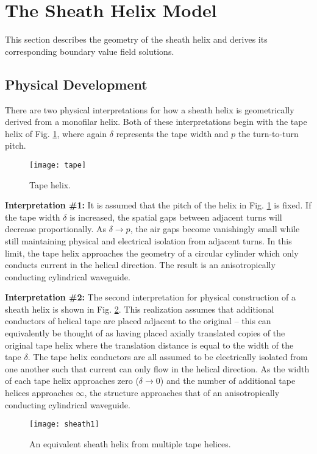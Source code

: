 \section{The Sheath Helix Model}\label{sec:sheath}
This section describes the geometry of the sheath helix and derives its corresponding boundary value field solutions. 
\subsection{Physical Development}
There are two physical interpretations for how a sheath helix is geometrically derived from a monofilar helix. Both of these interpretations begin with the tape helix of Fig. \ref{fig:tape}, where again $\delta$ represents the tape width and $p$ the turn-to-turn pitch. 
\begin{figure}[h]
	\centering
	\texttt{[image: tape]}
	\caption{Tape helix.}
	\label{fig:tape}
\end{figure}

\hspace*{2em} \textbf{Interpretation \#1:} It is assumed that the pitch of the helix in Fig. \ref{fig:tape} is fixed. If the tape width $\delta$ is increased, the spatial gaps between adjacent turns will decrease proportionally. As $\delta \rightarrow p$, the air gaps become vanishingly small while still maintaining physical and electrical isolation from adjacent turns. In this limit, the tape helix approaches the geometry of a circular cylinder which only conducts current in the helical direction. The result is an anisotropically conducting cylindrical waveguide. 

\hspace*{2em} \textbf{Interpretation \#2:} The second interpretation for physical construction of a sheath helix is shown in Fig. \ref{fig:sheath1}. This realization assumes that additional conductors of helical tape are placed adjacent to the original -- this can equivalently be thought of as having placed axially translated copies of the original tape helix where the translation distance is equal to the width of the tape $\delta$. The tape helix conductors are all assumed to be electrically isolated from one another such that current can only flow in the helical direction. As the width of each tape helix approaches zero ($\delta\rightarrow0$) and the number of additional tape helices approaches $\infty$, the structure approaches that of an anisotropically conducting cylindrical waveguide.
\begin{figure}[h]
	\centering
	\texttt{[image: sheath1]}
	\caption{An equivalent sheath helix from multiple tape helices.}
	\label{fig:sheath1}
\end{figure}

